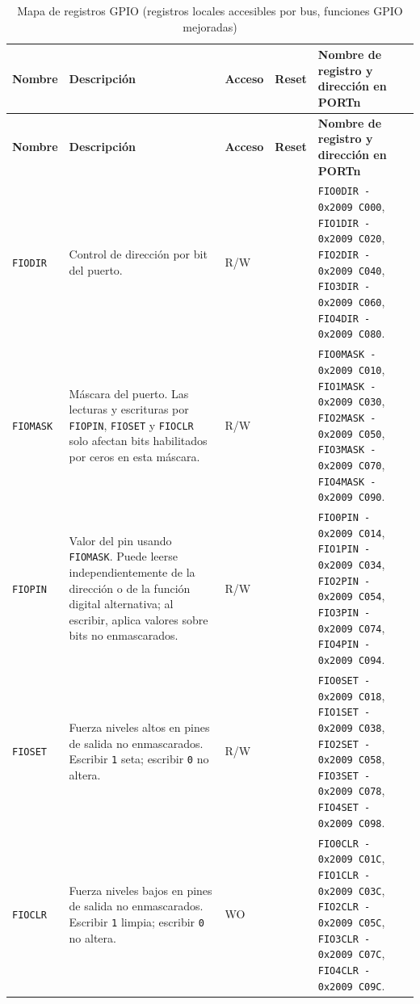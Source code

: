 \renewcommand{\arraystretch}{1.12}
\setlength{\LTleft}{0pt}
\setlength{\LTright}{0pt}

\begin{longtable}{|>{\raggedright\arraybackslash}p{}|>{\raggedright\arraybackslash}p{}|>{\centering\arraybackslash}p{}|>{\centering\arraybackslash}p{}|>{\raggedright\arraybackslash}p{}|}
\caption{Mapa de registros GPIO (registros locales accesibles por bus, funciones GPIO mejoradas)} \\
\hline
\textbf{Nombre} & \textbf{Descripción} & \textbf{Acceso} & \textbf{Reset} & \textbf{Nombre de registro y dirección en PORTn} \\
\hline
\endfirsthead
\hline
\textbf{Nombre} & \textbf{Descripción} & \textbf{Acceso} & \textbf{Reset} & \textbf{Nombre de registro y dirección en PORTn} \\
\hline
\endhead
\texttt{FIODIR} & Control de dirección por bit del puerto. & R/W & 0 & \texttt{FIO0DIR - 0x2009 C000}, \texttt{FIO1DIR - 0x2009 C020}, \texttt{FIO2DIR - 0x2009 C040}, \texttt{FIO3DIR - 0x2009 C060}, \texttt{FIO4DIR - 0x2009 C080}. \\
\hline
\texttt{FIOMASK} & Máscara del puerto. Las lecturas y escrituras por \texttt{FIOPIN}, \texttt{FIOSET} y \texttt{FIOCLR} solo afectan bits habilitados por ceros en esta máscara. & R/W & 0 & \texttt{FIO0MASK - 0x2009 C010}, \texttt{FIO1MASK - 0x2009 C030}, \texttt{FIO2MASK - 0x2009 C050}, \texttt{FIO3MASK - 0x2009 C070}, \texttt{FIO4MASK - 0x2009 C090}. \\
\hline
\texttt{FIOPIN} & Valor del pin usando \texttt{FIOMASK}. Puede leerse independientemente de la dirección o de la función digital alternativa; al escribir, aplica valores sobre bits no enmascarados. & R/W & 0 & \texttt{FIO0PIN - 0x2009 C014}, \texttt{FIO1PIN - 0x2009 C034}, \texttt{FIO2PIN - 0x2009 C054}, \texttt{FIO3PIN - 0x2009 C074}, \texttt{FIO4PIN - 0x2009 C094}. \\
\hline
\texttt{FIOSET} & Fuerza niveles altos en pines de salida no enmascarados. Escribir \texttt{1} seta; escribir \texttt{0} no altera. & R/W & 0 & \texttt{FIO0SET - 0x2009 C018}, \texttt{FIO1SET - 0x2009 C038}, \texttt{FIO2SET - 0x2009 C058}, \texttt{FIO3SET - 0x2009 C078}, \texttt{FIO4SET - 0x2009 C098}. \\
\hline
\texttt{FIOCLR} & Fuerza niveles bajos en pines de salida no enmascarados. Escribir \texttt{1} limpia; escribir \texttt{0} no altera. & WO & 0 & \texttt{FIO0CLR - 0x2009 C01C}, \texttt{FIO1CLR - 0x2009 C03C}, \texttt{FIO2CLR - 0x2009 C05C}, \texttt{FIO3CLR - 0x2009 C07C}, \texttt{FIO4CLR - 0x2009 C09C}. \\
\hline
\end{longtable}

